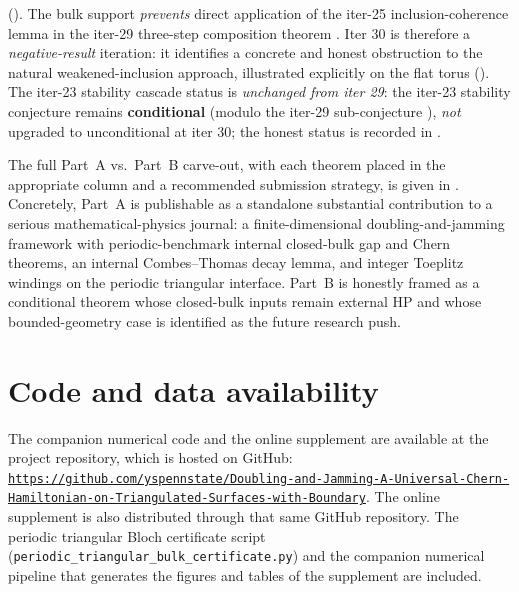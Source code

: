 \documentclass[11pt]{article}
\numberwithin{equation}{section}
\theoremstyle{definition}
\theoremstyle{remark}
\begin{document}
\begin{itemize}[leftmargin=2em]
(). The bulk support
\emph{prevents} direct application of the iter-25
inclusion-coherence lemma
 in the iter-29
three-step composition theorem
. Iter 30 is therefore
a \emph{negative-result} iteration: it identifies a concrete and
honest obstruction to the natural weakened-inclusion approach,
illustrated explicitly on the flat torus
(). The iter-23
stability cascade status is \emph{unchanged from iter 29}: the
iter-23 stability conjecture
 remains
\textbf{conditional} (modulo the iter-29 sub-conjecture
), \emph{not}
upgraded to unconditional at iter 30; the honest status is
recorded in
.
\end{itemize}

The full Part~A vs.\ Part~B carve-out, with each theorem placed in the appropriate column
and a recommended submission strategy, is given in .
Concretely, Part~A is publishable as a standalone substantial contribution to a serious
mathematical-physics journal: a finite-dimensional doubling-and-jamming framework with
periodic-benchmark internal closed-bulk gap and Chern theorems, an internal Combes--Thomas
decay lemma, and integer Toeplitz windings on the periodic triangular interface. Part~B is
honestly framed as a conditional theorem whose closed-bulk inputs remain external HP and
whose bounded-geometry case is identified as the future research push.

\section*{Code and data availability}\label{sec:code_availability}
The companion numerical code and the online supplement are available at the project repository,
which is hosted on GitHub:
\href{https://github.com/yspennstate/Doubling-and-Jamming-A-Universal-Chern-Hamiltonian-on-Triangulated-Surfaces-with-Boundary}{\texttt{https://github.com/yspennstate/Doubling-and-Jamming-A-Universal-Chern-Hamiltonian-on-Triangulated-Surfaces-with-Boundary}}.
The online supplement is also distributed through that same GitHub repository. The
periodic triangular Bloch certificate script
(\texttt{periodic\_triangular\_bulk\_certificate.py}) and the companion numerical pipeline
that generates the figures and tables of the supplement are included.
\end{document}
